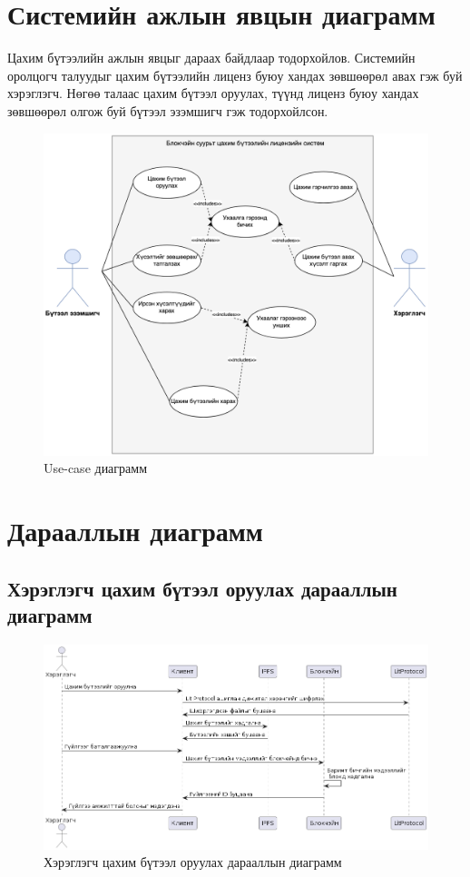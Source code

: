 \section{Системийн ажлын явцын диаграмм}
Цахим бүтээлийн ажлын явцыг дараах байдлаар тодорхойлов. Системийн оролцогч талуудыг цахим бүтээлийн лиценз буюу хандах зөвшөөрөл авах гэж буй хэрэглэгч. Нөгөө талаас цахим бүтээл оруулах, түүнд лиценз буюу хандах зөвшөөрөл олгож буй бүтээл эзэмшигч гэж тодорхойлсон.
\begin{figure}[h!]
	\centering
	\includegraphics[scale=0.36]{src/images/usecase.png}
	\caption{Use-case диаграмм}
\end{figure}

\pagebreak
\section{Дарааллын диаграмм}
\subsection{Хэрэглэгч цахим бүтээл оруулах дарааллын диаграмм}
\begin{figure}[h!]
	\centering
	\includegraphics[scale=0.55, angle=90]{src/images/sequence.png}
	\caption{Хэрэглэгч цахим бүтээл оруулах дарааллын диаграмм}
\end{figure}
